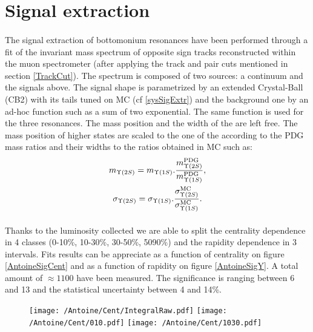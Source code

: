 \graphicspath{{Figures/Signal_Extraction}}

\section{\label{signalextraction}Signal extraction}

\paragraph{}
The signal extraction of bottomonium resonances have been performed through a fit of the invariant mass spectrum of opposite sign tracks reconstructed within the muon spectrometer (after applying the track and pair cuts mentioned in section \ref{TrackCut}).
The spectrum is composed of two sources: a continuum and the \upsi signals above.
The signal shape is parametrized by an extended Crystal-Ball (CB2) with its tails tuned on MC (cf \ref{sysSigExtr}) and the background one by an ad-hoc function such as a sum of two exponential.
The same function is used for the three \upsi resonances.
The mass position and the width of the \ups are left free.
The mass position of higher states are scaled to the one of the \ups according to the PDG mass ratios and their widths to the ratios obtained in MC such as:
\begin{gather*}
m_{\Upsilon(2S)} = m_{\Upsilon(1S)}.\frac{ m_{\Upsilon(2S)}^{\rm PDG} }{ m_{\Upsilon(1S)}^{\rm PDG} }, \\
\sigma_{\Upsilon(2S)} =  \sigma_{\Upsilon(1S)}.\frac{\sigma_{\Upsilon(2S)}^{\rm MC}}{\sigma_{\Upsilon(1S)}^{\rm MC}}.
\label{eq:sigmaratio}
\end{gather*}

\paragraph{}
Thanks to the luminosity collected we are able to split the centrality dependence in 4 classes (0-10\%, 10-30\%, 30-50\%, 5090\%)  and the rapidity dependence in 3 intervals.
Fits results can be appreciate as a function of centrality on figure \ref{AntoineSigCent} and as a function of rapidity on figure \ref{AntoineSigY}.
A total amount of $\approx1100$ \ups have been measured.
The significance is ranging between 6 and 13 and the statistical uncertainty between 4 and 14\%.

\begin{figure}[!h]
  \texttt{[image: /Antoine/Cent/IntegralRaw.pdf]}
  \texttt{[image: /Antoine/Cent/010.pdf]}
  \texttt{[image: /Antoine/Cent/1030.pdf]}
\end{figure}       

